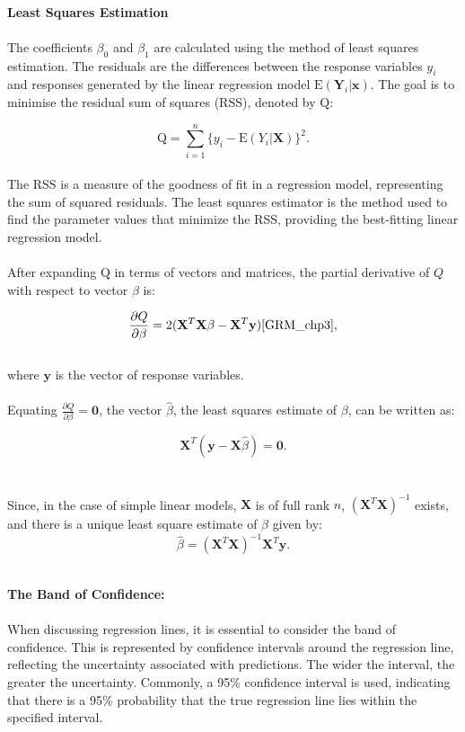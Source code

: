 \documentclass{article}\usepackage[]{graphicx}\usepackage[]{xcolor}
\begin{document}
\\\textbf{Least Squares Estimation}\\
\\The coefficients $\beta_0$ and $\beta_1$ are calculated using the method of least squares estimation. The residuals are the differences between the response variables $y_i$ and responses generated by the linear regression model $\mathrm{E}(\mathbf{Y}_i | \mathbf{x})$. The goal is to minimise the residual sum of squares (RSS), denoted by $\mathrm{Q}$: 

$$\mathrm{Q} = \sum_{i=1}^{n} \{y_i - \mathrm{E} (Y_i | \mathbf{X})\}^2 .$$
\\The RSS is a measure of the goodness of fit in a regression model, representing the sum of squared residuals. The least squares estimator is the method used to find the parameter values that minimize the RSS, providing the best-fitting linear regression model.
\\ 
\\After expanding $\mathrm{Q}$ in terms of vectors and matrices,  the partial derivative of $Q$ with respect to vector $\beta$ is:

$$\frac{\partial Q}{\partial \beta} = 2(\mathbf{X}^T\mathbf{X}\beta - \mathbf{X}^T\mathbf{y})\cite{GRM_chp3},$$
\\where $\mathbf{y}$ is the vector of response variables.
\\  
\\Equating $\frac{\partial Q}{\partial \beta} = \mathbf{0}$, the vector $\hat{\beta}$,  the least squares estimate of $\beta$, can be written as:

$$\mathbf{X}^T(\mathbf{y}-\mathbf{X}\hat{\beta})=\mathbf{0}.$$
\\  
\\Since, in the case of simple linear models, $\mathbf{X}$ is of full rank $n$, $(\mathbf{X}^T\mathbf{X})^{-1}$ exists, and there is a unique least square estimate of $\beta$ given by:
$$\hat{\beta} = (\mathbf{X}^T\mathbf{X})^{-1}\mathbf{X}^T\mathbf{y}.$$

\\\textbf{The Band of Confidence:}\\
\\When discussing regression lines, it is essential to consider the band of confidence. This is represented by confidence intervals around the regression line, reflecting the uncertainty associated with predictions. The wider the interval, the greater the uncertainty. Commonly, a 95\% confidence interval is used, indicating that there is a 95\% probability that the true regression line lies within the specified interval.\\
\end{document}
